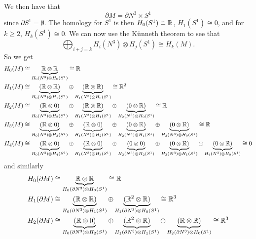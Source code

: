 \documentclass{article}
\begin{document}
\begin{example}
\begin{itemize}
We then have that 
\begin{equation}
    \partial M = \partial N^3 \times S^1
\end{equation}
since $\partial S^1 = \emptyset$. The homology for $S^1$ is then $H_0(S^1)\cong \mathbb{R}$, $H_1(S^1)\cong 0$, and for $k\geq 2$, $H_k(S^1)\cong 0$. We can now use the K\"unneth theorem to see that
\begin{equation}
    \bigoplus_{i+j=k} H_i(N^3)\otimes H_j(S^1) \cong H_k(M).
\end{equation}
So we get
\begin{align*}
    H_0(M) &\cong \underbrace{\mathbb{R} \otimes \mathbb{R}}_{H_0(N^3)\otimes H_0(S^1)} \cong \mathbb{R}\\
    H_1(M) &\cong \underbrace{(\mathbb{R} \otimes \mathbb{R})}_{H_0(N^3)\otimes H_1(S^1)} \oplus \underbrace{(\mathbb{R} \otimes \mathbb{R})}_{H_1(N^3)\otimes H_0(S^1)} \cong \mathbb{R}^2\\
    H_2(M) &\cong \underbrace{(\mathbb{R} \otimes 0)}_{H_0(N^3)\otimes H_2(S^1)} \oplus \underbrace{(\mathbb{R} \otimes \mathbb{R})}_{H_1(N^3)\otimes H_1(S^1)} \oplus \underbrace{(0 \otimes \mathbb{R})}_{H_2(N^3)\otimes H_0(S^1)} \cong \mathbb{R}\\
    H_3(M) &\cong \underbrace{(\mathbb{R} \otimes 0)}_{H_0(N^3)\otimes H_3(S^1)} \oplus \underbrace{(\mathbb{R} \otimes 0)}_{H_1(N^3)\otimes H_2(S^1)} \oplus \underbrace{(0 \otimes \mathbb{R})}_{H_2(N^3)\otimes H_1(S^1)} \oplus \underbrace{(0 \otimes \mathbb{R})}_{H_3(N^3)\otimes H_0(S^1)} \cong \mathbb{R}\\
    H_4(M) &\cong \underbrace{(\mathbb{R} \otimes 0)}_{H_0(N^3)\otimes H_4(S^1)} \oplus \underbrace{(\mathbb{R} \otimes 0)}_{H_1(N^3)\otimes H_3(S^1)} \oplus \underbrace{(0 \otimes 0)}_{H_2(N^3)\otimes H_2(S^1)} \oplus \underbrace{(0 \otimes \mathbb{R})}_{H_3(N^3)\otimes H_1(S^1)} \oplus \underbrace{(0 \otimes \mathbb{R})}_{H_4(N^3)\otimes H_0(S^1)} \cong 0
\end{align*}
and similarly 
\begin{align*}
    H_0(\partial M) &\cong \underbrace{\R \otimes \R}_{H_0(\partial N^3)\otimes H_0(S^1)} \cong \R \\
    H_1(\partial M) &\cong \underbrace{(\R \otimes \R)}_{H_0(\partial N^3)\otimes H_1(S^1)} \oplus \underbrace{(\R^2 \otimes \R)}_{H_1(\partial N^3)\otimes H_0(S^1)} \cong \R^3 \\
    H_2(\partial M) &\cong \underbrace{(\R \otimes 0)}_{H_0(\partial N^3)\otimes H_2(S^1)} \oplus \underbrace{(\R^2 \otimes \R)}_{H_1(\partial N^3)\otimes H_1(S^1)} \oplus \underbrace{(\R \otimes \R)}_{H_2(\partial N^3)\otimes H_0(S^1)} \cong \R^3\\

\end{align*}
\end{itemize}
\end{example}
\end{document}
